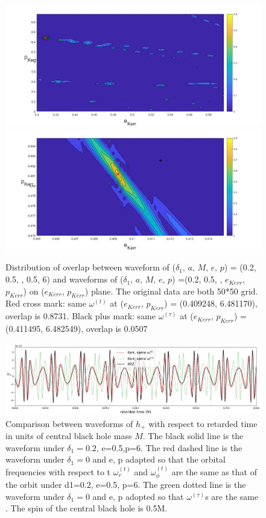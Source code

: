 \documentclass{article}
\begin{document}
\begin{figure}[]
	\centering
	\includegraphics[width=16cm]{OLdist.png}
	\includegraphics[width=16cm]{OLdist2.png}
	
	\caption{Distribution of overlap between waveform of ($\delta_1,\, a,\, M,\, e,\, p$) = (0.2, 0.5, , 0.5, 6) and waveforms of ($\delta_1,\, a,\, M,\, e,\, p$) =(0.2, 0.5, , $e_{Kerr}$, $p_{Kerr}$) on ($e_{Kerr}$, $p_{Kerr}$) plane. The original data are both 50*50 grid. Red cross mark: same $\omega^{(t)}$ at ($e_{Kerr}$, $p_{Kerr}$) = (0.409248, 6.481170), overlap is 0.8731. Black plus mark: same $\omega^{(\tau)}$ at  ($e_{Kerr}$, $p_{Kerr}$) = (0.411495, 6.482549), overlap is 0.0507 }
	\label{overlapdist}
\end{figure}

\begin{figure}[!htb]
	\centering
	\includegraphics[width=16cm]{krz_kerr_wave.png}
	
	\caption{Comparison between waveforms of $h_+$ with respect to retarded time in units of central black hole mass $M$. The black solid line is the waveform under $\delta_1=0.2$, e=0.5,p=6. The red dashed line is the waveform under $\delta_1=0$ and e, p adapted so that the orbital frequencies with respect to t $\omega^{(t)}_r$ and $\omega^{(t)}_\phi$ are the same as that of the orbit under d1=0.2, e=0.5, p=6. The green dotted line is the waveform under $\delta_1 =0$ and e, p adopted so that $\omega^{(\tau)}$s are the same . The spin of the central black hole is 0.5M.}
	\label{kkwave}
\end{figure}	
	
\end{document}

